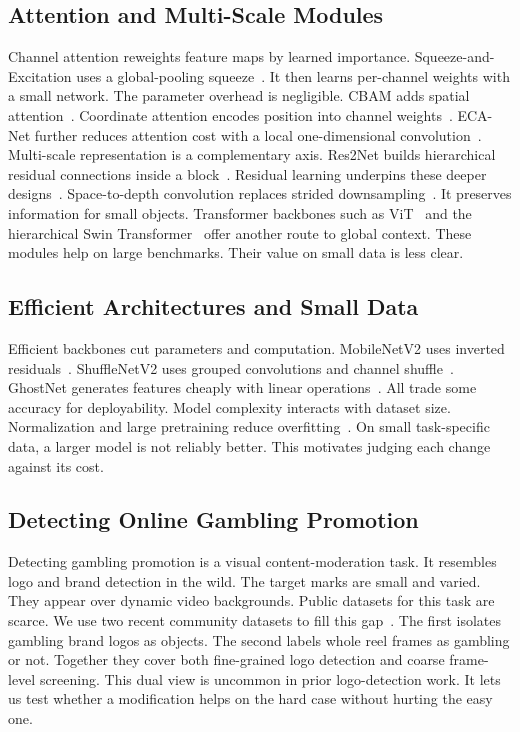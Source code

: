 \documentclass[conference,a4paper]{IEEEtran}
\begin{document}
\subsection{Attention and Multi-Scale Modules}
Channel attention reweights feature maps by learned importance.
Squeeze-and-Excitation uses a global-pooling squeeze~\cite{hu2018squeeze}. It
then learns per-channel weights with a small network. The parameter overhead
is negligible. CBAM adds spatial attention~\cite{woo2018cbam}. Coordinate
attention encodes position into channel weights~\cite{hou2021coordinate}.
ECA-Net further reduces attention cost with a local one-dimensional
convolution~\cite{wang2020eca}. Multi-scale representation is a complementary
axis. Res2Net builds hierarchical residual connections inside a
block~\cite{gao2021res2net}. Residual learning underpins these deeper
designs~\cite{he2016deep}. Space-to-depth convolution replaces strided
downsampling~\cite{sunkara2022no}. It preserves information for small objects.
Transformer backbones such as ViT~\cite{dosovitskiy2021image} and the
hierarchical Swin Transformer~\cite{liu2021swin} offer another route to global
context. These modules help on large benchmarks. Their value on small data is
less clear.

\subsection{Efficient Architectures and Small Data}
Efficient backbones cut parameters and computation. MobileNetV2 uses
inverted residuals~\cite{sandler2018mobilenetv2}. ShuffleNetV2 uses grouped
convolutions and channel shuffle~\cite{ma2018shufflenet}. GhostNet generates
features cheaply with linear operations~\cite{han2020ghostnet}. All trade some
accuracy for deployability. Model complexity interacts with dataset size.
Normalization and large pretraining reduce
overfitting~\cite{ioffe2015batch, deng2009imagenet}. On small task-specific
data, a larger model is not reliably better. This motivates judging each
change against its cost.

\subsection{Detecting Online Gambling Promotion}
Detecting gambling promotion is a visual content-moderation task. It resembles
logo and brand detection in the wild. The target marks are small and varied.
They appear over dynamic video backgrounds. Public datasets for this task are
scarce. We use two recent community datasets to fill this
gap~\cite{dataset_v21_roboflow, dataset_judi3k_kaggle}. The first isolates
gambling brand logos as objects. The second labels whole reel frames as
gambling or not. Together they cover both fine-grained logo detection and
coarse frame-level screening. This dual view is uncommon in prior logo-detection
work. It lets us test whether a modification helps on the hard case without
hurting the easy one.
\end{document}
